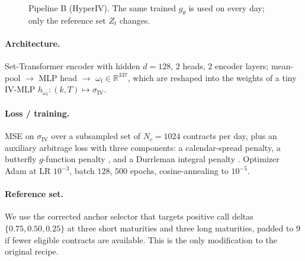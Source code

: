 \documentclass[11pt,a4paper]{article}
\newcommand{\iv}{\sigma_{\mathrm{IV}}}
\begin{document}
\begin{figure}[H]
\centering
{}
\caption{Pipeline B (HyperIV). The same trained $g_\theta$ is used on every
day; only the reference set $Z_t$ changes.}
\end{figure}

\paragraph{Architecture.} Set-Transformer encoder
\citep{lee2019set,vaswani2017attention} with hidden $d{=}128$, $2$ heads,
$2$ encoder layers; mean-pool $\to$ MLP head $\to$ $\omega_t \in
\mathbb{R}^{337}$, which are reshaped into the weights of a tiny IV-MLP
$h_{\omega_t} : (k, T) \mapsto \iv$.

\paragraph{Loss / training.} MSE on $\iv$ over a subsampled set of
$N_c = 1024$ contracts per day, plus an auxiliary arbitrage loss with three
components: a calendar-spread penalty, a butterfly $g$-function penalty
\citep{roper2010arbitrage}, and a Durrleman integral penalty
\citep{durrleman2010g}. Optimizer Adam at LR $10^{-3}$, batch $128$,
$500$ epochs, cosine-annealing to $10^{-5}$.

\paragraph{Reference set.} We use the corrected anchor selector that
targets positive call deltas $\{0.75, 0.50, 0.25\}$ at three short
maturities and three long maturities, padded to $9$ if fewer eligible
contracts are available. This is the only modification to the original
\citet{yang2025hyperiv} recipe.
\end{document}
